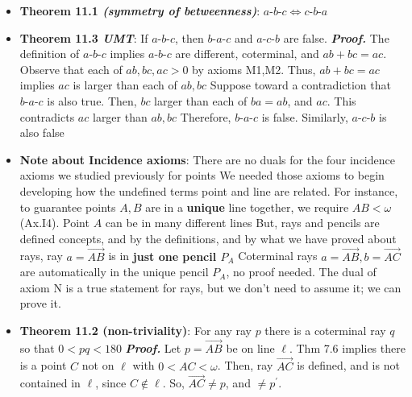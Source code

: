 \documentclass{report}
\begin{document}
\begin{itemize}
\begin{itemize}
\begin{enumerate}[label=(\alph*)]
                    \end{enumerate}
                \item \textbf{Theorem 11.1 \textit{(symmetry of betweenness)}}: $ a\text{-}b\text{-}c \iff c\text{-}b\text{-}a$
                \item \textbf{Theorem 11.3 \textit{UMT}}: If $ a\text{-}b\text{-}c$, then $ b\text{-}a\text{-}c$ and $ a\text{-}c\text{-}b$ are false.
                    \bigbreak \noindent 
                    \textbf{\textit{Proof.}} The definition of $ a\text{-}b\text{-}c$ implies $ a\text{-}b\text{-}c$ are different, coterminal, and $ab + bc = ac$. 
                    \bigbreak \noindent 
                    Observe that each of $ab,bc,ac >0$ by axioms M1,M2. Thus, $ab + bc =ac$ implies $ac$ is larger than each of $ab,bc$
                    \bigbreak \noindent 
                    Suppose toward a contradiction that $ b\text{-}a\text{-}c$ is also true. Then, $ bc$ larger than each of $ba = ab$, and $ac$. This contradicts $ac$ larger than $ab, bc $
                    \bigbreak \noindent 
                    Therefore, $ b\text{-}a\text{-}c$ is false. Similarly, $ a\text{-}c\text{-}b$ is also false \endpf
                \item \textbf{Note about Incidence axioms}: There are no duals for the four incidence axioms we studied previously for points
                    \bigbreak \noindent 
                    We needed those axioms to begin developing how the undefined terms point and line are related. For instance, to guarantee points $A,B$ are in a \textbf{unique} line together, we require $AB < \omega$ (Ax.I4). Point $A$ can be in many different lines
                    \bigbreak \noindent 
                    But, rays and pencils are defined concepts, and by the definitions, and by what we have proved about rays, ray $a = \overrightarrow{AB}$ is in \textbf{just one pencil $P_{A} $}
                    \bigbreak \noindent 
                    Coterminal rays $a = \overrightarrow{AB}, b = \overrightarrow{AC}$ are automatically in the unique pencil $P_{A}$, no proof needed.
                    \bigbreak \noindent 
                    The dual of axiom N is a true statement for rays, but we don't need to assume it; we can prove it.
                \item \textbf{Theorem 11.2 (non-triviality)}: For any ray $p$ there is a coterminal ray $q$ so that $0 < pq < 180$
                    \bigbreak \noindent 
                    \textbf{\textit{Proof.}} Let $p = \overrightarrow{AB}$ be on line $\ell$. Thm 7.6 implies there is a point $C$ not on $\ell$ with $0 < AC < \omega$. Then, ray $\overrightarrow{AC}$ is defined, and is not contained in $\ell$, since $C \not\in \ell$. So, $\overrightarrow{AC} \ne p$, and $\ne p^{\prime}$. 

\end{itemize}
\end{itemize}
\end{document}
